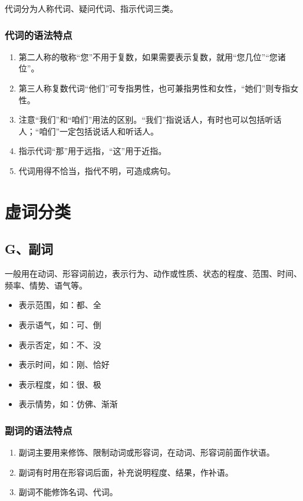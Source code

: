 代词分为人称代词、疑问代词、指示代词三类。

\subsubsection*{代词的语法特点}
\begin{enumerate}
    \item 第二人称的敬称“您”不用于复数，如果需要表示复数，就用“您几位”“您诸位”。
    \item 第三人称复数代词“他们”可专指男性，也可兼指男性和女性，“她们”则专指女性。
    \item 注意“我们”和“咱们”用法的区别。“我们”指说话人，有时也可以包括听话人；“咱们”一定包括说话人和听话人。
    \item 指示代词“那”用于远指，“这”用于近指。
    \item 代词用得不恰当，指代不明，可造成病句。
\end{enumerate}

\section{虚词分类}

\subsection{G、副词}
一般用在动词、形容词前边，表示行为、动作或性质、状态的程度、范围、时间、频率、情势、语气等。

\begin{itemize}
    \item 表示范围，如：都、全
    \item 表示语气，如：可、倒
    \item 表示否定，如：不、没
    \item 表示时间，如：刚、恰好
    \item 表示程度，如：很、极
    \item 表示情势，如：仿佛、渐渐
\end{itemize}

\subsubsection*{副词的语法特点}
\begin{enumerate}
    \item 副词主要用来修饰、限制动词或形容词，在动词、形容词前面作状语。
    \item 副词有时用在形容词后面，补充说明程度、结果，作补语。
    \item 副词不能修饰名词、代词。
\end{enumerate}


